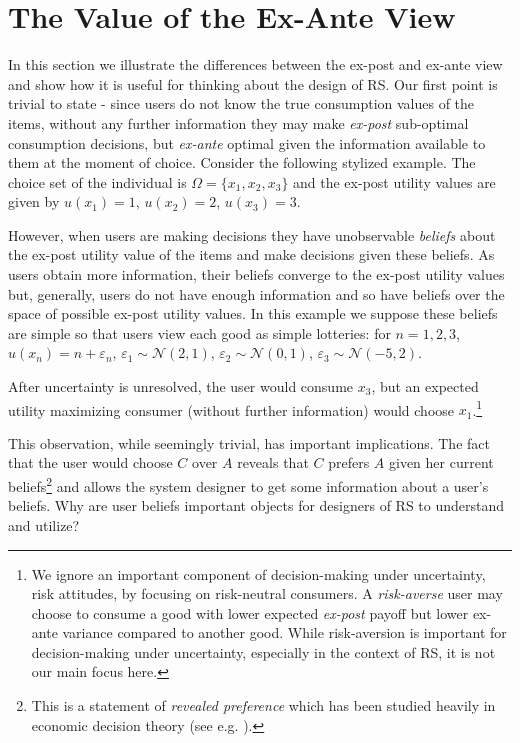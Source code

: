 \documentclass[sigconf]{acmart}
\begin{document}
\section{The Value of the Ex-Ante View}

In this section we illustrate the differences between the ex-post and ex-ante view and show how it is useful for thinking about the design of RS. Our first point is trivial to state - since users do not know the true consumption values of the items, without any further information they may make \textit{ex-post} sub-optimal consumption decisions, but \textit{ex-ante} optimal given the information available to them at the moment of choice. Consider the following stylized example. The choice set of the individual is $\Omega= \{x_1, x_2, x_3 \}$ and the ex-post utility values are given by
$u(x_1) = 1$, $u(x_2) = 2$, $u(x_3) = 3$. 
\par
However, when users are making decisions they have unobservable \textit{beliefs} about the ex-post utility value of the items and make decisions given these beliefs. As users obtain more information, their beliefs converge to the ex-post utility values but, generally, users do not have enough information and so have beliefs over the space of possible ex-post utility values. In this example we suppose these beliefs are simple so that users view each good as simple lotteries: for $n=1,2,3$, $u(x_n) = n + \varepsilon_n$, $\varepsilon_1 \sim \mathcal N (2, 1)$, $\varepsilon_2 \sim \mathcal N (0, 1)$, $\varepsilon_3 \sim \mathcal N (-5, 2)$.
\par
After uncertainty is unresolved, the user would consume $x_3$, but an expected utility maximizing consumer (without further information) would choose $x_1$.\footnote{We ignore an important component of decision-making under uncertainty, risk attitudes, by focusing on risk-neutral consumers. A \textit{risk-averse} user may choose to consume a good with lower expected \textit{ex-post} payoff but lower ex-ante variance compared to another good. While risk-aversion is important for decision-making under uncertainty, especially in the context of RS, it is not our main focus here.}
\par
This observation, while seemingly trivial, has important implications. The fact that the user would choose $C$ over $A$ reveals that $C$ prefers $A$ given her current beliefs\footnote{This is a statement of \textit{revealed preference} which has been studied heavily in economic decision theory (see e.g. \cite[]{mas1995microeconomic}).} and allows the system designer to get some information about a user's beliefs. Why are user beliefs important objects for designers of RS to understand and utilize?
\end{document}
